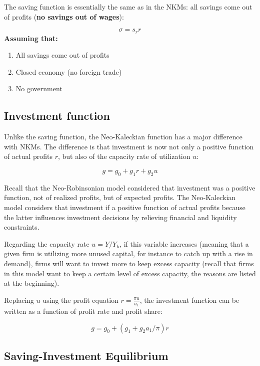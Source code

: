 \documentclass[
  letterpaper,
  DIV=11,
  numbers=noendperiod]{scrreprt}
\providecommand{\tightlist}{%
  \setlength{\itemsep}{0pt}\setlength{\parskip}{0pt}}\usepackage{longtable,booktabs,array}
\begin{document}
The saving function is essentially the same as in the NKMs: all savings
come out of profits (\textbf{no savings out of wages}):

\[\sigma = s_rr\] \textbf{Assuming that:}

\begin{enumerate}
\def\labelenumi{\arabic{enumi}.}
\tightlist
\item
  All savings come out of profits
\item
  Closed economy (no foreign trade)
\item
  No government
\end{enumerate}

\hypertarget{investment-function}{%
\subsection{Investment function}\label{investment-function}}

Unlike the saving function, the Neo-Kaleckian function has a major
difference with NKMs. The difference is that investment is now not only
a positive function of actual profits \(r\), but also of the capacity
rate of utilization \(u\):

\[g = g_0+g_1r+g_2u\]

Recall that the Neo-Robinsonian model considered that investment was a
positive function, not of realized profits, but of expected profits. The
Neo-Kaleckian model considers that investment if a positive function of
actual profits because the latter influences investment decisions by
relieving financial and liquidity constraints.

Regarding the capacity rate \(u = Y/Y_k\), if this variable increases
(meaning that a given firm is utilizing more unused capital, for
instance to catch up with a rise in demand), firms will want to invest
more to keep excess capacity (recall that firms in this model want to
keep a certain level of excess capacity, the reasons are listed at the
beginning).

Replacing \(u\) using the profit equation \(r = \frac{\pi u}{a_1}\), the
investment function can be written as a function of profit rate and
profit share:

\[g = g_0+(g_1+g_2a_1/\pi)r\]

\hypertarget{saving-investment-equilibrium}{%
\subsection{Saving-Investment
Equilibrium}\label{saving-investment-equilibrium}}
\end{document}
